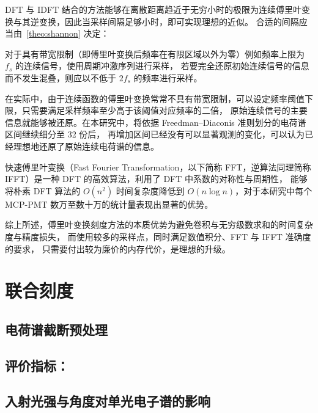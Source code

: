 DFT 与 IDFT 结合的方法能够在离散距离趋近于无穷小时的极限为连续傅里叶变换与其逆变换，因此当采样间隔足够小时，即可实现理想的近似。
合适的间隔应当由~\ref{theo:shannon} 决定：
\begin{theorem}\label{theo:shannon}
    对于具有带宽限制（即傅里叶变换后频率在有限区域以外为零）例如频率上限为 $f_s$ 的连续信号，使用周期冲激序列进行采样，
    若要完全还原初始连续信号的信息而不发生混叠，则应以不低于 $2f_s$ 的频率进行采样。
\end{theorem}

在实际中，由于连续函数的傅里叶变换常常不具有带宽限制，可以设定频率阈值下限，只需要满足采样频率至少高于该阈值对应频率的二倍，
原始连续信号的主要信息就能够被还原。在本研究中，将依据 Freedman–Diaconis 准则划分的电荷谱区间继续细分至 32 份后，
再增加区间已经没有可以显著观测的变化，可以认为已经理想地还原了原始连续电荷谱的信息。

快速傅里叶变换（Fast Fourier Transformation，以下简称 FFT，逆算法同理简称 IFFT）是一种 DFT 的高效算法，利用了 DFT 中系数的对称性与周期性，
能够将朴素 DFT 算法的 $O(n^2)$ 时间复杂度降低到 $O(n\log{n})$，对于本研究中每个 MCP-PMT 数万至数十万的统计量表现出显著的优势。

综上所述，傅里叶变换刻度方法的本质优势为避免卷积与无穷级数求和的时间复杂度与精度损失，
而使用较多的采样点，同时满足数值积分、FFT 与 IFFT 准确度的要求，
只需要付出较为廉价的内存代价，是理想的升级。

\section{联合刻度}

\subsection{电荷谱截断预处理}

\subsection{评价指标：}

\subsection{入射光强与角度对单光电子谱的影响}
